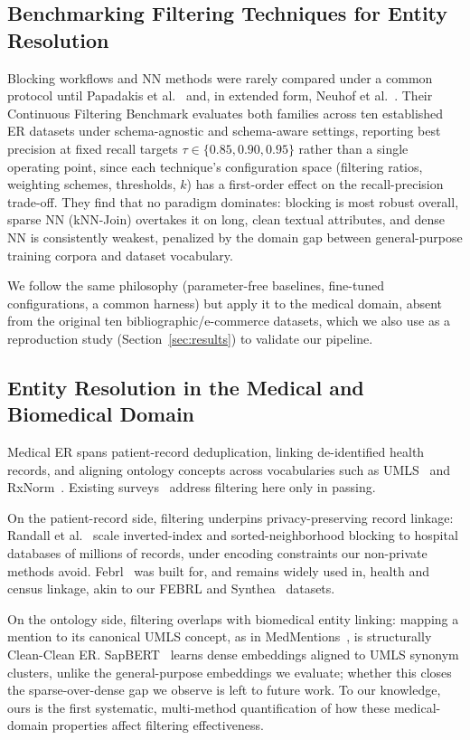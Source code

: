 \documentclass[runningheads]{llncs}
\begin{document}
\subsection{Benchmarking Filtering Techniques for Entity Resolution}

Blocking workflows and NN methods were rarely compared under a common protocol until
Papadakis et al.~\cite{papadakis2023benchmarking} and, in extended form, Neuhof et
al.~\cite{neuhof2024open}. Their Continuous Filtering Benchmark evaluates both families across
ten established ER datasets under schema-agnostic and schema-aware settings, reporting best
precision at fixed recall targets $\tau \in \{0.85, 0.90, 0.95\}$ rather than a single
operating point, since each technique's configuration space (filtering ratios, weighting
schemes, thresholds, $k$) has a first-order effect on the recall-precision trade-off. They
find that no paradigm dominates: blocking is most robust overall, sparse NN (kNN-Join)
overtakes it on long, clean textual attributes, and dense NN is consistently weakest,
penalized by the domain gap between general-purpose training corpora and dataset vocabulary.

We follow the same philosophy (parameter-free baselines, fine-tuned configurations, a common
harness) but apply it to the medical domain, absent from the original ten
bibliographic/e-commerce datasets, which we also use as a reproduction study
(Section~\ref{sec:results}) to validate our pipeline.

\subsection{Entity Resolution in the Medical and Biomedical Domain}
Medical ER spans patient-record deduplication, linking de-identified health records, and
aligning ontology concepts across vocabularies such as UMLS~\cite{bodenreider2004umls} and
RxNorm~\cite{nelson2011rxnorm}. Existing surveys~\cite{papadakis2021survey} address filtering
here only in passing.

On the patient-record side, filtering underpins privacy-preserving record linkage: Randall et
al.~\cite{randall2014pprl} scale inverted-index and sorted-neighborhood blocking to hospital
databases of millions of records, under encoding constraints our non-private methods avoid.
Febrl~\cite{christen2008febrl} was built for, and remains widely used in, health and census
linkage, akin to our FEBRL and Synthea~\cite{walonoski2018synthea} datasets.

On the ontology side, filtering overlaps with biomedical entity linking: mapping a mention to
its canonical UMLS concept, as in MedMentions~\cite{mohan2019medmentions}, is structurally
Clean-Clean ER. SapBERT~\cite{liu2021sapbert} learns dense embeddings aligned to UMLS synonym
clusters, unlike the general-purpose embeddings we evaluate; whether this closes the
sparse-over-dense gap we observe is left to future work. To our knowledge, ours is the first
systematic, multi-method quantification of how these medical-domain properties affect
filtering effectiveness.
\end{document}
